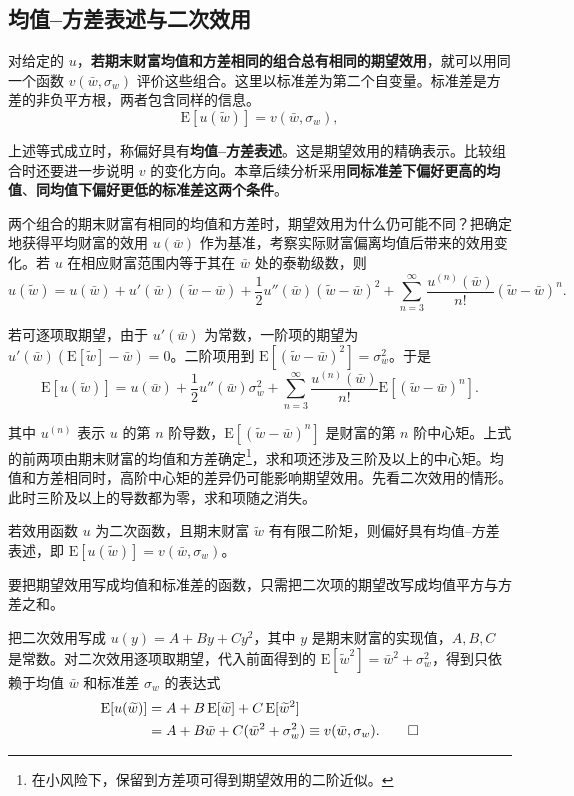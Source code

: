 \subsection{均值--方差表述与二次效用}
对给定的 $u$，\textbf{若期末财富均值和方差相同的组合总有相同的期望效用}，就可以用同一个函数 $v(\bar w,\sigma_w)$ 评价这些组合。这里以标准差为第二个自变量。标准差是方差的非负平方根，两者包含同样的信息。
\begin{equation}
 \mathrm E[u(\widetilde w)]=v(\bar w,\sigma_w),
 \label{eq:wj-12-1}
\end{equation}

上述等式成立时，称偏好具有\textbf{均值--方差表述}。这是期望效用的精确表示。比较组合时还要进一步说明 $v$ 的变化方向。本章后续分析采用\textbf{同标准差下偏好更高的均值}、\textbf{同均值下偏好更低的标准差这两个条件}。

两个组合的期末财富有相同的均值和方差时，期望效用为什么仍可能不同？把确定地获得平均财富的效用 $u(\bar w)$ 作为基准，考察实际财富偏离均值后带来的效用变化。若 $u$ 在相应财富范围内等于其在 $\bar w$ 处的泰勒级数，则
\[
 u(\widetilde w)=u(\bar w)+u'(\bar w)(\widetilde w-\bar w)
 +\frac12u''(\bar w)(\widetilde w-\bar w)^2
 +\sum_{n=3}^{\infty}\frac{u^{(n)}(\bar w)}{n!}(\widetilde w-\bar w)^n.
\]

若可逐项取期望，由于 $u'(\bar w)$ 为常数，一阶项的期望为 $u'(\bar w)(\mathrm E[\widetilde w]-\bar w)=0$。二阶项用到 $\mathrm E[(\widetilde w-\bar w)^2]=\sigma_w^2$。于是
\[
 \mathrm E[u(\widetilde w)]=u(\bar w)+\frac12u''(\bar w)\sigma_w^2
 +\sum_{n=3}^{\infty}\frac{u^{(n)}(\bar w)}{n!}\mathrm E[(\widetilde w-\bar w)^n].
\]

其中 $u^{(n)}$ 表示 $u$ 的第 $n$ 阶导数，$\mathrm E[(\widetilde w-\bar w)^n]$ 是财富的第 $n$ 阶中心矩。上式的前两项由期末财富的均值和方差确定\footnote{在小风险下，保留到方差项可得到期望效用的二阶近似。}，求和项还涉及三阶及以上的中心矩。均值和方差相同时，高阶中心矩的差异仍可能影响期望效用。先看二次效用的情形。此时三阶及以上的导数都为零，求和项随之消失。


\begin{tcolorbox}[knowledge]
 若效用函数 $u$ 为二次函数，且期末财富 $\widetilde w$ 有有限二阶矩，则偏好具有均值--方差表述，即 $\mathrm E[u(\widetilde w)]=v(\bar w,\sigma_w)$。
\end{tcolorbox}

要把期望效用写成均值和标准差的函数，只需把二次项的期望改写成均值平方与方差之和。

\begin{solution}[label-content={证明},blank-type=none]
把二次效用写成 $u(y)=A+By+Cy^2$，其中 $y$ 是期末财富的实现值，$A,B,C$ 是常数。对二次效用逐项取期望，代入前面得到的 $\mathrm E[\widetilde w^2]=\bar w^2+\sigma_w^2$，得到只依赖于均值 $\bar w$ 和标准差 $\sigma_w$ 的表达式
\begin{align*}
 \mathrm E[u(\widetilde w)]
 &= A+B\,\mathrm E[\widetilde w]+C\,\mathrm E[\widetilde w^2]\\
 &= A+B\bar w+C(\bar w^2+\sigma_w^2)
 \equiv v(\bar w,\sigma_w).\qedhere
\end{align*}
\end{solution}


